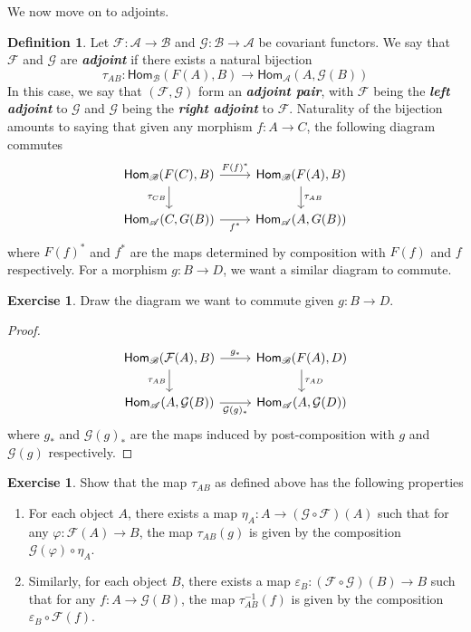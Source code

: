 \documentclass[psamsfonts]{amsart}
\theoremstyle{definition}
\newtheorem{defn}[thm]{Definition}
\newtheorem{exer}[thm]{Exercise}
\theoremstyle{remark}
\renewcommand{\hom}{\mathsf{Hom}}
\newcommand{\ib}[1]{\textbf{\textit{#1}}}
\newcommand{\inv}{^{-1}}
\begin{document}
We now move on to adjoints.
\begin{defn}
Let $\mathcal{F}: \mathscr{A} \to \mathscr{B}$ and $\mathcal{G}: \mathscr{B} \to \mathscr{A}$ be covariant functors. We say that $\mathcal{F}$ and $\mathcal{G}$ are \ib{adjoint} if there exists a natural bijection
$$\tau_{AB} : \hom_{\mathscr{B}}(F(A),B) \to \hom_{\mathscr{A}}(A, \mathcal{G}(B)) $$
In this case, we say that $(\mathcal{F},\mathcal{G})$ form an \ib{adjoint pair}, with $\mathcal{F}$ being the \ib{left adjoint} to $\mathcal{G}$ and $\mathcal{G}$ being the \ib{right adjoint} to $\mathcal{F}$. Naturality of the bijection amounts to saying that given any morphism $f : A \to C$, the following diagram commutes
$$\begin{tikzcd}
\hom_\mathscr{B}(F(C),B) \arrow[d,"\tau_{CB}"']\arrow[r,"F(f)^*"] & \hom_\mathscr{B}(F(A),B) \arrow[d, "\tau_{AB}"] \\
\hom_\mathscr{A}(C,G(B)) \arrow[r, "f^*"'] & \hom_\mathscr{A}(A,G(B))
\end{tikzcd}$$
where $F(f)^*$ and $f^*$ are the maps determined by composition with $F(f)$ and $f$ respectively. For a morphism $g: B \to D$, we want a similar diagram to commute.
\end{defn}
%
\begin{exer}
Draw the diagram we want to commute given $g: B \to D$.
\end{exer}
%
\begin{proof}
$$\begin{tikzcd}
\hom_\mathscr{B}(\mathcal{F}(A),B) \arrow[d,"\tau_{AB}"'] \arrow[r,"g_*"] & \hom_\mathscr{B}(F(A),D) \arrow[d,"\tau_{AD}"] \\
\hom_\mathscr{A}(A,\mathcal{G}(B)) \arrow[r,"\mathcal{G}(g)_*"'] & \hom_\mathscr{A}(A,\mathcal{G}(D))
\end{tikzcd}$$
where $g_*$ and $\mathcal{G}(g)_*$ are the maps induced by post-composition with $g$ and $\mathcal{G}(g)$  respectively.
\end{proof}
%
\begin{exer}
Show that the map $\tau_{AB}$ as defined above has the following properties
\begin{enumerate}
\item For each object $A$, there exists a map $\eta_A: A \to (\mathcal{G} \circ \mathcal{F})(A)$ such that for any $\varphi : \mathcal{F}(A) \to  B$, the map $\tau_{AB}(g)$ is given by the composition $\mathcal{G}(\varphi) \circ \eta_A$.
\item Similarly, for each object $B$, there exists a map $\varepsilon_B : (\mathcal{F} \circ \mathcal{G})(B) \to B$ such that for any $f : A \to \mathcal{G}(B)$, the map $\tau\inv_{AB}(f)$ is given by the composition $\varepsilon_B \circ \mathcal{F}(f)$.
\end{enumerate}
\end{exer}
\end{document}
